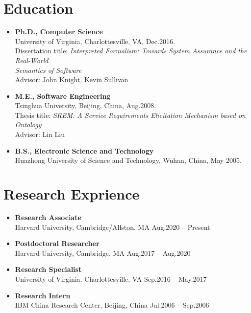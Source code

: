 \documentclass[11pt]{article}
\begin{document}


\section{Education}

\begin{itemize}
  \item \textbf{Ph.D., Computer Science} \\
\phantom{\qquad} University of Virginia, Charlottesville, VA, Dec.2016. \\
\phantom{\qquad} Dissertation title: \emph{Interpreted Formalism: Towards System Assurance and the Real-World}\\
\phantom{\qquad} \emph{Semantics of Software} \\
\phantom{\qquad} Advisor: John Knight, Kevin Sullivan
   \item \textbf{M.E., Software Engineering} \\
\phantom{\qquad} Tsinghua University, Beijing, China, Aug.2008. \\
\phantom{\qquad} Thesis title: \emph{SREM: A Service Requirements Elicitation Mechanism based on Ontology} \\
\phantom{\qquad} Advisor: Lin Liu 
   \item \textbf{B.S., Electronic Science and Technology} \\
\phantom{\qquad} Huazhong University of Science and Technology, Wuhan, China, May 2005.
\end{itemize}



\section{Research Exprience}


\begin{itemize}
    \item \textbf{Research Associate} \\
Harvard University, Cambridge/Allston, MA \hfill Aug.2020 – Present
    \item \textbf{Postdoctoral Researcher} \\
Harvard University, Cambridge, MA \hfill Aug.2017 – Aug.2020
    \item \textbf{Research Specialist}	\\
University of Virginia, Charlottesville, VA \hfill  Sep.2016 – May.2017
    \item \textbf{Research Intern} \\
IBM China Research Center, Beijing, China \hfill  Jul.2006 – Sep.2006
\end{itemize}
\end{document}
